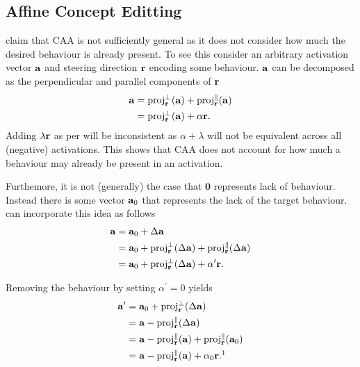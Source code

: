 \subsection{Affine Concept Editting}
\label{sec:ace}

\citet{ace} claim that CAA \citep{caa} is not sufficiently general as it does not consider how much the desired behaviour is already present.
To see this consider an arbitrary activation vector $\mathbf{a}$ and steering direction $\mathbf{r}$ encoding some behaviour.
$\mathbf{a}$ can be decomposed as the perpendicular and parallel components of $\mathbf{r}$
\begin{equation}
    \label{eq:components}
    \begin{aligned}
        \mathbf{a} &= \text{proj}_{\mathbf{r}}^{\perp}(\mathbf{a}) + \text{proj}_{\mathbf{r}}^{\parallel}(\mathbf{a}) \\
            &= \text{proj}_{\mathbf{r}}^{\perp}(\mathbf{a}) + \alpha\mathbf{r}.
    \end{aligned}
\end{equation}
Adding $\lambda\mathbf{r}$ as per  will be inconsistent as $\alpha + \lambda$ will not be equivalent across all (negative) activations.
This shows that CAA \citep{caa} does not account for how much a behaviour may already be present in an activation.

Furthemore, it is not (generally) the case that $\mathbf{0}$ represents lack of behaviour.
Instead there is some vector $\mathbf{a}_0$ that represents the lack of the target behaviour.
 can incorporate this idea as follows
\begin{align*}
    \mathbf{a} &= \mathbf{a}_0 + \Delta\mathbf{a} \\
        &= \mathbf{a}_0 + \text{proj}_{\mathbf{r}}^{\perp}(\Delta\mathbf{a}) + \text{proj}_{\mathbf{r}}^{\parallel}(\Delta\mathbf{a}) \\
        &= \mathbf{a}_0 + \text{proj}_{\mathbf{r}}^{\perp}(\Delta\mathbf{a}) + \alpha^\prime\mathbf{r}.
\end{align*}

Removing the behaviour by setting $\alpha^\prime = 0$ yields
\begin{align*}
    \va^\prime &= \va_0 + \text{proj}_\vr^{\perp}(\Delta\va) \\
               &= \va - \text{proj}_\vr^{\parallel}(\Delta\va) \\
               &= \va - \text{proj}_\vr^{\parallel}(\va) + \text{proj}_\vr^{\parallel}(\va_0) \\
               &= \va - \text{proj}_\vr^{\parallel}(\va) + \alpha_0\vr.\footnotemark[1]
\end{align*}

